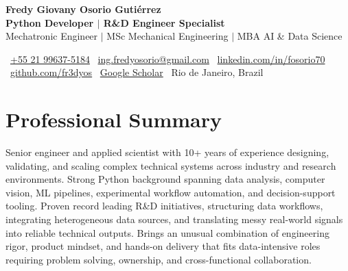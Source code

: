 \documentclass[11pt,a4paper]{article}
\begin{document}
\begin{center}
    {\Huge\bfseries \color{secondary} Fredy Giovany Osorio Gutiérrez}\\[0.3cm]
    {\Large \bf \color{stronger} Python Developer $|$ R\&D Engineer Specialist}\\[0.2cm]
    {\large Mechatronic Engineer $|$ MSc Mechanical Engineering $|$ MBA AI \& Data Science}
\end{center}

\vspace{0.2cm}

\begin{center}
\small
\faPhone\ \href{https://wa.me/+5521996375184}{+55 21 99637-5184} \quad
\faEnvelope\ \href{mailto:ing.fredyosorio@gmail.com}{ing.fredyosorio@gmail.com} \quad
\faLinkedin\ \href{https://www.linkedin.com/in/fosorio70}{linkedin.com/in/fosorio70}\\[0.1cm]
\faGithub\ \href{https://github.com/fr3dyos}{github.com/fr3dyos} \quad
\faGoogle\ \href{https://scholar.google.com/citations?user=UPffCNYAAAAJ}{Google Scholar} \quad
\faMapMarker\ Rio de Janeiro, Brazil \quad \\
\end{center}
\section*{Professional Summary}
Senior engineer and applied scientist with 10+ years of experience designing, validating, and scaling complex technical systems across industry and research environments. Strong Python background spanning data analysis, computer vision, ML pipelines, experimental workflow automation, and decision-support tooling. Proven record leading R\&D initiatives, structuring data workflows, integrating heterogeneous data sources, and translating messy real-world signals into reliable technical outputs. Brings an unusual combination of engineering rigor, product mindset, and hands-on delivery that fits data-intensive roles requiring problem solving, ownership, and cross-functional collaboration.
\end{document}
